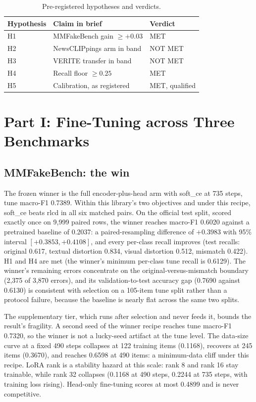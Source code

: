 \documentclass[conference]{IEEEtran}
\begin{document}
\begin{table}[t]
\centering
\caption{Pre-registered hypotheses and verdicts.}
\label{tab:hypotheses}
\begin{tabular}{lll}
\toprule
Hypothesis & Claim in brief & Verdict \\
\midrule
H1 & MMFakeBench gain $\geq +0.03$ & MET \\
H2 & NewsCLIPpings arm in band & NOT MET \\
H3 & VERITE transfer in band & NOT MET \\
H4 & Recall floor $\geq 0.25$ & MET \\
H5 & Calibration, as registered & MET, qualified \\
\bottomrule
\end{tabular}
\end{table}

\section{Part I: Fine-Tuning across Three Benchmarks}

\subsection{MMFakeBench: the win}

The frozen winner is the full encoder-plus-head arm with soft\_ce at 735 steps, tune macro-F1 0.7389. Within this library's two objectives and under this recipe, soft\_ce beats rlcd in all six matched pairs. On the official test split, scored exactly once on 9,999 paired rows, the winner reaches macro-F1 0.6020 against a pretrained baseline of 0.2037: a paired-resampling difference of $+0.3983$ with 95\% interval $[+0.3853, +0.4108]$, and every per-class recall improves (test recalls: original 0.617, textual distortion 0.834, visual distortion 0.512, mismatch 0.422). H1 and H4 are met (the winner's minimum per-class tune recall is 0.6129). The winner's remaining errors concentrate on the original-versus-mismatch boundary (2,375 of 3,870 errors), and its validation-to-test accuracy gap (0.7690 against 0.6130) is consistent with selection on a 105-item tune split rather than a protocol failure, because the baseline is nearly flat across the same two splits.

The supplementary tier, which runs after selection and never feeds it, bounds the result's fragility. A second seed of the winner recipe reaches tune macro-F1 0.7320, so the winner is not a lucky-seed artifact at the tune level. The data-size curve at a fixed 490 steps collapses at 122 training items (0.1168), recovers at 245 items (0.3670), and reaches 0.6598 at 490 items: a minimum-data cliff under this recipe. LoRA rank is a stability hazard at this scale: rank 8 and rank 16 stay trainable, while rank 32 collapses (0.1168 at 490 steps, 0.2244 at 735 steps, with training loss rising). Head-only fine-tuning scores at most 0.4899 and is never competitive.
\end{document}
